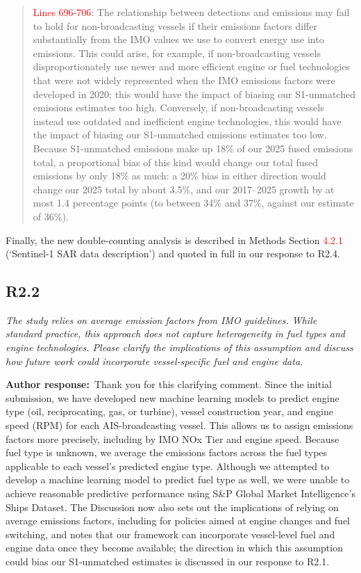 \documentclass[11pt]{article}
\newcommand{\point}[1]{\subsection*{\normalfont\bfseries #1}}
\newcommand{\response}{\par\medskip\noindent%
  \textbf{\textcolor{respblue}{Author response:}}\ }
\begin{document}
\begin{quote}
\textcolor{red}{Lines 696-706}: The relationship between detections and emissions may fail to hold for non-broadcasting vessels if their emissions factors differ substantially from the IMO values we use to convert energy use into emissions. This could arise, for example, if non-broadcasting vessels disproportionately use newer and more efficient engine or fuel technologies that were not widely represented when the IMO emissions factors were developed in 2020; this would have the impact of biasing our S1-unmatched emissions estimates too high. Conversely, if non-broadcasting vessels instead use outdated and inefficient engine technologies, this would have the impact of biasing our S1-unmatched emissions estimates too low. Because S1-unmatched emissions make up 18\% of our 2025 fused emissions total, a proportional bias of this kind would change our total fused emissions by only 18\% as much: a 20\% bias in either direction would change our 2025 total by about 3.5\%, and our 2017--2025 growth by at most 1.4 percentage points (to between 34\% and 37\%, against our estimate of 36\%).
\end{quote}

Finally, the new double-counting analysis is described in Methods Section \textcolor{red}{4.2.1} (`Sentinel-1 SAR data description') and quoted in full in our response to R2.4.



\point{R2.2}

\begin{refquote}\itshape
The study relies on average emission factors from IMO guidelines. While standard
practice, this approach does not capture heterogeneity in fuel types and engine
technologies. Please clarify the implications of this assumption and discuss how
future work could incorporate vessel-specific fuel and engine data.
\end{refquote}

\response Thank you for this clarifying comment. Since the initial submission, we have developed new machine learning models to predict engine type (oil, reciprocating, gas, or turbine), vessel construction year, and engine speed (RPM) for each AIS-broadcasting vessel. This allows us to assign emissions factors more precisely, including by IMO NOx Tier and engine speed. Because fuel type is unknown, we average the emissions factors across the fuel types applicable to each vessel's predicted engine type. Although we attempted to develop a machine learning model to predict fuel type as well, we were unable to achieve reasonable predictive performance using S\&P Global Market Intelligence's Ships Dataset. The Discussion now also sets out the implications of relying on average emissions factors, including for policies aimed at engine changes and fuel switching, and notes that our framework can incorporate vessel-level fuel and engine data once they become available; the direction in which this assumption could bias our S1-unmatched estimates is discussed in our response to R2.1.
\end{document}
